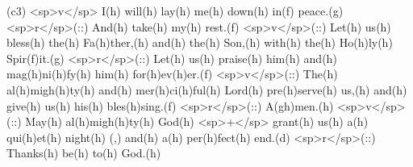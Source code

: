 (c3) <sp>v</sp> I(h) will(h) lay(h) me(h) down(h) in(f) peace.(g) <sp>r</sp>(::) And(h) take(h) my(h) rest.(f) <sp>v</sp>(::) Let(h) us(h) bless(h) the(h) Fa(h)ther,(h) and(h) the(h) Son,(h) with(h) the(h) Ho(h)ly(h) Spir(f)it.(g) <sp>r</sp>(::) Let(h) us(h) praise(h) him(h) and(h) mag(h)ni(h)fy(h) him(h) for(h)ev(h)er.(f) <sp>v</sp>(::) The(h) al(h)migh(h)ty(h) and(h) mer(h)ci(h)ful(h) Lord(h) pre(h)serve(h) us,(h) and(h) give(h) us(h) his(h) bles(h)sing.(f) <sp>r</sp>(::) A(gh)men.(h) <sp>v</sp>(::) May(h) al(h)migh(h)ty(h) God(h) <sp>+</sp> grant(h) us(h) a(h) qui(h)et(h) night(h) (,) and(h) a(h) per(h)fect(h) end.(d) <sp>r</sp>(::) Thanks(h) be(h) to(h) God.(h)